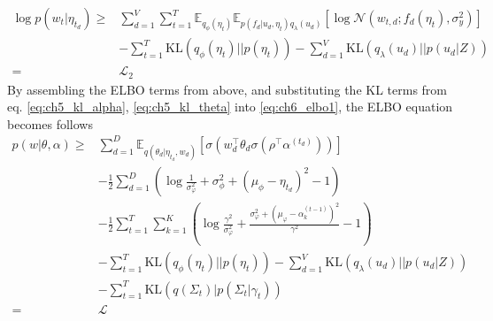 

\begin{align}\label{eq:ch5_elbo_p2}
\log p(w_t|\eta_{t_d})\geq&\sum_{d=1}^{V}\sum_{t=1}^{T}\mathbb{E}_{q_\phi(\eta_t)}\mathbb{E}_{p(f_d|u_d,\eta_t)q_{\lambda}(u_d)}\left[\log\mathcal{N}(w_{t,d};f_d(\eta_t),\sigma_y^2)\right]\\
&-\sum_{t=1}^{T}\text{KL}(q_{\phi}(\eta_t)||p(\eta_t))-\sum_{d=1}^{V}\text{KL}(q_\lambda(u_d)||p(u_d|Z))\\
=&\mathcal{L}_2
\end{align}
By assembling the ELBO terms from above, and substituting the KL terms from eq. \ref{eq:ch5_kl_alpha}, \ref{eq:ch5_kl_theta} into \ref{eq:ch6_elbo1}, the ELBO equation becomes follows
\begin{align}\label{eq:ch6_elbo2}
p(w|\theta,\alpha)\geq&\sum_{d=1}^{D}\mathbb{E}_{ q(\theta_d|\eta_{t_d},w_d)}[\sigma(w_{d}^\top\theta_d\sigma(\rho^\top\alpha^{(t_d)}))]\\
&-\frac{1}{2}\sum_{d=1}^{D}\left(\log\frac{1}{\sigma_\varphi^2}+\sigma_\phi^2+(\mu_\phi-\eta_{t_d})^2-1\right)\\
&-\frac{1}{2}\sum_{t=1}^{T}\sum_{k=1}^{K}\left(\log\frac{\gamma^2}{\sigma_\varphi^2}+\frac{\sigma_\varphi^2+(\mu_\varphi-\alpha_k^{(t-1)})^2}{\gamma^2}-1\right)\\
&-\sum_{t=1}^{T}\text{KL}(q_{\phi}(\eta_t)||p(\eta_t))-\sum_{d=1}^{V}\text{KL}(q_\lambda(u_d)||p(u_d|Z))\\
&-\sum_{t=1}^{T}\text{KL}(q(\Sigma_{t})|p(\Sigma_{t}|\gamma_{t}))\\
=&\mathcal{L}
\end{align}

